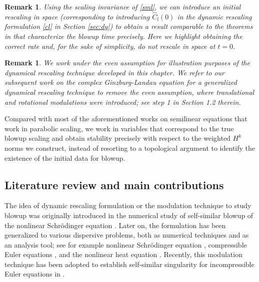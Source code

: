 \documentclass[12pt]{caltech_thesis}
\newtheorem{remark}[theorem]{Remark}
\numberwithin{equation}{section}
\begin{document}
\begin{remark}
    Using the scaling invariance of \eqref{sml}, we can introduce an initial rescaling in space (corresponding to introducing $\hat{C}_l(0)$  in the dynamic rescaling formulation \eqref{cl} in Section \ref{sec:dy}) to obtain a result comparable to the theorems in \cite{bricmont1994universality,merle1997stability} that characterize the blowup time precisely. Here we highlight obtaining the correct rate and, for the sake of simplicity, do not rescale in space at $t=0$.


\end{remark}\begin{remark} We work under the even assumption for illustration purposes of the dynamical rescaling technique developed in this chapter. We refer to our subsequent work \cite{chen2024stability} on the complex Ginzburg-Landau equation for a generalized dynamical rescaling technique to remove the even assumption, where translational and rotational modulations were introduced; see step 1 in Section 1.2 therein.
\end{remark}
Compared with most of the aforementioned works on semilinear equations that work in parabolic scaling, we work in variables that correspond to the true blowup scaling and obtain stability precisely with respect to the weighted $H^k$ norms we construct, instead of resorting to a topological argument to identify the existence of the initial data for blowup.
\subsection{Literature review and main contributions}
The idea of dynamic rescaling formulation or the modulation technique to study blowup was originally introduced in the numerical study of self-similar blowup of the nonlinear Schr\"odinger equation  \cite{weinstein1985modulational,soffer1990multichannel,soffer2006soliton,mclaughlin1986focusing,landman1988rate}. Later on, the formulation has been generalized to various dispersive problems, both as numerical techniques and as an analysis tool; see for example nonlinear Schr\"odinger equation \cite{kenig2006global,merle2005blow}, compressible Euler equations \cite{buckmaster2019formation},  and the nonlinear heat equation \cite{berger1988rescaling,merle1997stability}. Recently, this modulation technique has been adopted to establish self-similar singularity for incompressible Euler equations in \cite{ elgindi2021finite, chen2019finite2, chen2022stable}.
\end{document}
